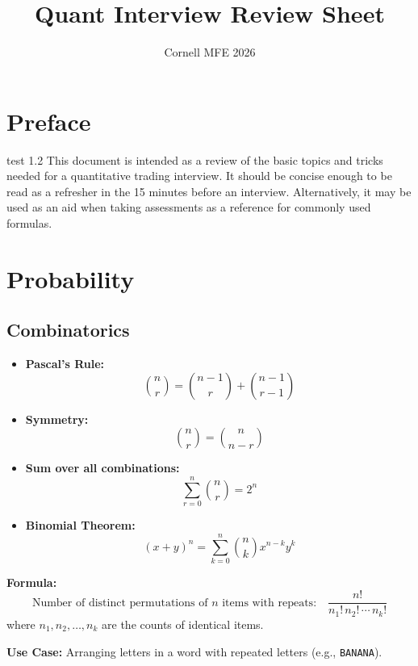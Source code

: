 \documentclass{article}
\title{Quant Interview Review Sheet}
\author{Cornell MFE 2026}
\begin{document}
\maketitle
\tableofcontents

\section{Preface}
test 1.2
This document is intended as a review of the basic topics and tricks needed for a quantitative trading interview. It should be concise enough to be read as a refresher in the 15 minutes before an interview. Alternatively, it may be used as an aid when taking assessments as a reference for commonly used formulas.

\newpage

\section{Probability}
\subsection{Combinatorics}

\begin{tcolorbox}[title=Useful Combinatorics Identities]
\begin{itemize}
  \item \textbf{Pascal's Rule:}
  \[
  \binom{n}{r} = \binom{n-1}{r} + \binom{n-1}{r-1}
  \]

  \item \textbf{Symmetry:}
  \[
  \binom{n}{r} = \binom{n}{n - r}
  \]

  \item \textbf{Sum over all combinations:}
  \[
  \sum_{r=0}^{n} \binom{n}{r} = 2^n
  \]

  \item \textbf{Binomial Theorem:}
  \[
  (x + y)^n = \sum_{k=0}^{n} \binom{n}{k} x^{n-k} y^k
  \]
\end{itemize}
\end{tcolorbox}

\begin{tcolorbox}[title=Permutations with Identical Items]
\textbf{Formula:}
\[
\text{Number of distinct permutations of } n \text{ items with repeats:} \quad
\frac{n!}{n_1! \, n_2! \, \cdots \, n_k!}
\]
where \( n_1, n_2, \ldots, n_k \) are the counts of identical items.

\textbf{Use Case:} Arranging letters in a word with repeated letters (e.g., \texttt{BANANA}).

\end{tcolorbox}
\end{document}
